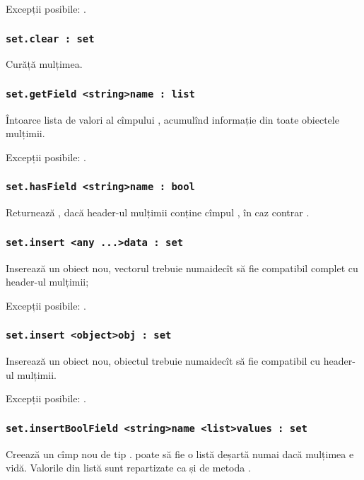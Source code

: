 Excepții posibile: .

\subsubsection{\lstinline|set.clear : set|}

Curăță mulțimea.

\subsubsection{\lstinline|set.getField <string>name : list|}

Întoarce lista de valori al cîmpului , acumulînd informație din toate obiectele mulțimii.

Excepții posibile: .

\subsubsection{\lstinline|set.hasField <string>name : bool|}

Returnează \true, dacă header-ul mulțimii conține cîmpul , în caz contrar \false.

\subsubsection{\lstinline|set.insert <any ...>data : set|}

Inserează un obiect nou, vectorul  trebuie numaidecît să fie compatibil complet cu header-ul mulțimii;

Excepții posibile: .

\subsubsection{\lstinline|set.insert <object>obj : set|}

Inserează un obiect nou, obiectul  trebuie numaidecît să fie compatibil cu header-ul mulțimii.

Excepții posibile: .

\subsubsection{\lstinline|set.insertBoolField <string>name <list>values : set|}

Creează un cîmp nou de tip \bool.  poate să fie o listă deșartă numai dacă mulțimea e vidă. Valorile din listă sunt repartizate ca și de metoda .

